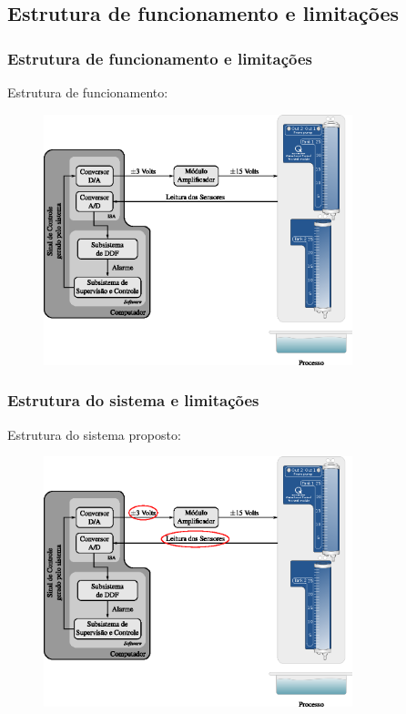 \documentclass{beamer}
\begin{document}
\subsection{Estrutura de funcionamento e limitações}
\begin{frame}
    \frametitle{Estrutura de funcionamento e limitações}

    Estrutura de funcionamento:

\begin{figure}[htb]
\centering
    \includegraphics[width=0.8\textwidth]{imgs/sistema/eps/func_sistema}
\end{figure}
\end{frame}

\begin{frame}
    \frametitle{Estrutura do sistema e limitações}

    Estrutura do sistema proposto:

\begin{figure}[htb]
\centering
    \includegraphics[width=0.8\textwidth]{imgs/sistema/eps/func_sistema_mod}
\end{figure}
\end{frame}
\end{document}
